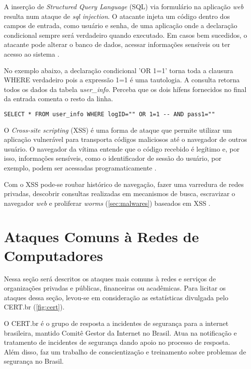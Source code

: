 A inserção de \textit{Structured Query Language} (SQL) via formulário na aplicação \textit{web} resulta num ataque de \textit{sql injection}. O atacante injeta um código dentro dos campos de entrada, como usuário e senha, de uma aplicação onde a declaração condicional sempre será verdadeiro quando executado. Em casos bem sucedidos, o atacante pode alterar o banco de dados, acessar informações sensíveis ou ter acesso ao sistema \cite{sqlinjection:sankaran}.

No exemplo abaixo, a declaração condicional 'OR 1=1' torna toda a clausura WHERE verdadeiro pois a expressão 1=1 é uma tautologia. A consulta retorna todos os dados da tabela \textit{user\_info}. Perceba que os dois hífens fornecidos no final da entrada comenta o resto da linha.

\begin{lstlisting}[Language=SQL, frame=single] 
  SELECT * FROM user_info WHERE logID="" OR 1=1 -- AND pass1="" 
\end{lstlisting}

O \textit{Cross-site scripting} (XSS) é uma forma de ataque que permite utilizar um aplicação vulnerável para transporta códigos maliciosos até o navegador de outros usuário. O navegador da vítima entende que o código recebido é legítimo e, por isso, informações sensíveis, como o identificador de sessão do usuário, por exemplo, podem ser acessadas programaticamente \cite{pentestweb:nelson}.

Com o XSS pode-se roubar histórico de navegação, fazer uma varredura de redes privadas, descobrir consultas realizadas em mecanismos de busca, escravizar o navegador \textit{web} e proliferar \textit{worms} (\autoref{sec:malwares}) baseados em XSS \cite{pentestweb:nelson}. 

\section{Ataques Comuns à Redes de Computadores} \label{sec:ataques-comuns}

Nessa seção será descritos os ataques mais comuns à redes e serviços de organizações privadas e públicas, financeiras ou acadêmicas. Para licitar os ataques dessa seção, levou-se em consideração as estatísticas divulgada pelo CERT.br (\autoref{fig:cert}).

O CERT.br é o grupo de resposta a incidentes de segurança para a internet brasileira, mantido Comitê Gestor da Internet no Brasil. Atua na notificação e tratamento de incidentes de segurança dando apoio no processo de resposta. Além disso, faz um trabalho de conscientização e treinamento sobre problemas de segurança no Brasil. 


